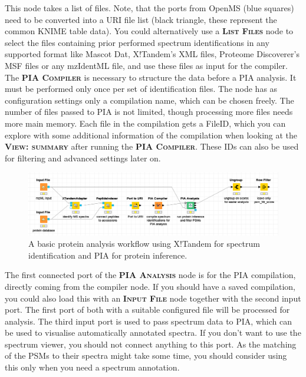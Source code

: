 \documentclass[a4paper,11pt,twoside]{article}
\newcommand{\menu}[1]{{\scshape\bfseries #1}}
\newcommand{\knimenode}[1]{{\scshape\bfseries #1}}
\begin{document}
This node takes a list of files. Note, that the ports from OpenMS (blue squares)
need to be converted into a URI file list (black triangle, these represent the
common KNIME table data). You could alternatively use a \knimenode{List Files}
node to select the files containing prior performed spectrum identifications in
any supported format like Mascot Dat, X!Tandem's XML files, Proteome
Discoverer's MSF files or any mzIdentML file, and use these files as input for
the compiler. The \knimenode{PIA Compiler} is necessary to structure the data
before a PIA analysis. It must be performed only once per set
of identification files. The node has as configuration settings only a
compilation name, which can be chosen freely. The number of files passed to PIA
is not limited, though processing more files needs more main memory. Each file
in the compilation gets a FileID, which you can explore with some additional
information of the compilation when looking at the \menu{View: summary} after
running the \knimenode{PIA Compiler}. These IDs can also be used for filtering
and advanced settings later on.

\begin{figure}[ht!]
	\centering
	\includegraphics[width=\textwidth]{graphics/first_analysis_workflow}
	\caption{A basic protein analysis workflow using X!Tandem for spectrum
	identification and PIA for protein inference.}
\end{figure}

The first connected port of the \knimenode{PIA Analysis} node is for the PIA
compilation, directly coming from the compiler node. If you should have a saved
compilation, you could also load this with an \knimenode{Input File} node
together with the second input port. The first port of both with a suitable
configured file will be processed for analysis. The third input port is used to
pass spectrum data to PIA, which can be used to visualise automatically
annotated spectra. If you don't want to use the spectrum viewer, you should not
connect anything to this port. As the matching of the PSMs to their spectra
might take some time, you should consider using this only when you need a
spectrum annotation.
\end{document}
